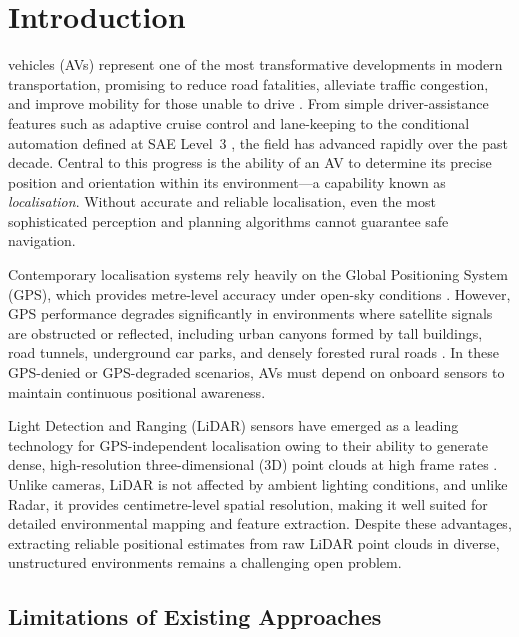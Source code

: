 \documentclass[lettersize,journal]{IEEEtran}
\begin{document}
\section{Introduction}

 vehicles (AVs) represent one of the most transformative
developments in modern transportation, promising to reduce road fatalities, alleviate
traffic congestion, and improve mobility for those unable to drive \cite{hussain2019autonomous}.
From simple driver-assistance features such as adaptive cruise control and lane-keeping
to the conditional automation defined at SAE Level~3 \cite{sae2021j3016}, the field has
advanced rapidly over the past decade. Central to this progress is the ability of an AV
to determine its precise position and orientation within its environment---a capability
known as \emph{localisation}. Without accurate and reliable localisation, even the most
sophisticated perception and planning algorithms cannot guarantee safe navigation.

Contemporary localisation systems rely heavily on the Global Positioning System (GPS),
which provides metre-level accuracy under open-sky conditions
\cite{luo2019localization}. However, GPS performance degrades significantly in
environments where satellite signals are obstructed or reflected, including urban
canyons formed by tall buildings, road tunnels, underground car parks, and densely
forested rural roads \cite{schreiber2016vehicle}. In these GPS-denied or GPS-degraded
scenarios, AVs must depend on onboard sensors to maintain continuous positional
awareness.

Light Detection and Ranging (LiDAR) sensors have emerged as a leading technology for
GPS-independent localisation owing to their ability to generate dense, high-resolution
three-dimensional (3D) point clouds at high frame rates \cite{kocic2018sensors}.
Unlike cameras, LiDAR is not affected by ambient lighting conditions, and unlike Radar,
it provides centimetre-level spatial resolution, making it well suited for detailed
environmental mapping and feature extraction. Despite these advantages, extracting
reliable positional estimates from raw LiDAR point clouds in diverse, unstructured
environments remains a challenging open problem.

\subsection{Limitations of Existing Approaches}
\end{document}
